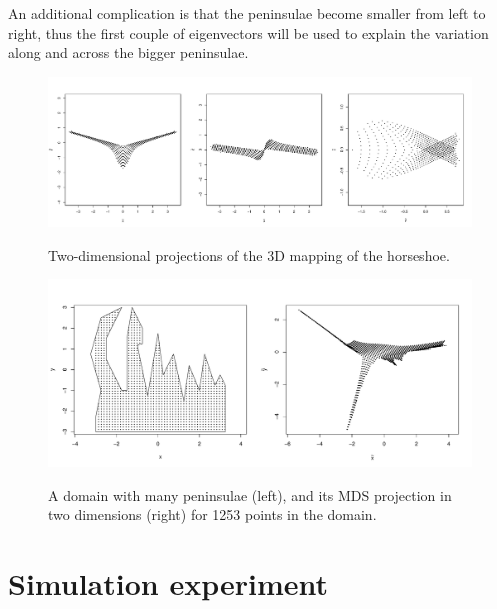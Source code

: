 \documentclass[a4paper,10pt]{amsart}
\begin{document}
An additional complication is that the peninsulae become smaller from left to right, thus the first couple of eigenvectors will be used to explain the variation along and across the bigger peninsulae.




\begin{figure}
\centering
\includegraphics[trim=0in 0.5in 0in 0.25in, width=5.5in]{figs/ramsay-mds-3d.pdf} \\
\caption{Two-dimensional projections of the 3D mapping of the horseshoe.}
\label{ramsay-mds-3d}
\end{figure}

\begin{figure}
\centering
\includegraphics[width=6in]{figs/wt2-mds.pdf}\\
\caption{A domain with many peninsulae (left), and its MDS projection in two dimensions (right) for 1253 points in the domain.}
\label{wt2dia}
\end{figure}








\section{Simulation experiment}
\end{document}
